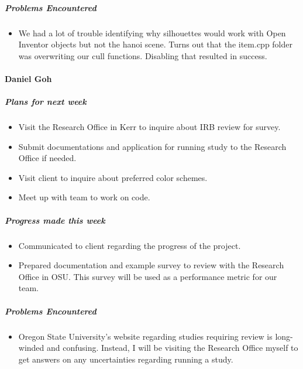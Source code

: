 {\subparagraph{Problems Encountered}
\begin{itemize}
  \item We had a lot of trouble identifying why silhouettes would work with Open Inventor objects but not the hanoi scene. Turns out that the item.cpp folder was overwriting our cull functions. Disabling that resulted in success.
\end{itemize}

\vspace{3mm}
\paragraph{Daniel Goh}
\subparagraph{Plans for next week}
\begin{itemize}
  \item Visit the Research Office in Kerr to inquire about IRB review for survey.
  \item Submit documentations and application for running study to the Research Office if needed.
  \item Visit client to inquire about preferred color schemes.
  \item Meet up with team to work on code.
\end{itemize}

\subparagraph{Progress made this week}
\begin{itemize}
  \item Communicated to client regarding the progress of the project.
  \item Prepared documentation and example survey to review with the Research Office in OSU. This survey will be used as a performance metric for our team.
\end{itemize}

\subparagraph{Problems Encountered}
\begin{itemize}
  \item Oregon State University's website regarding studies requiring review is long-winded and confusing. Instead, I will be visiting the Research Office myself to get answers on any uncertainties regarding running a study.
\end{itemize}

}

\newpage

